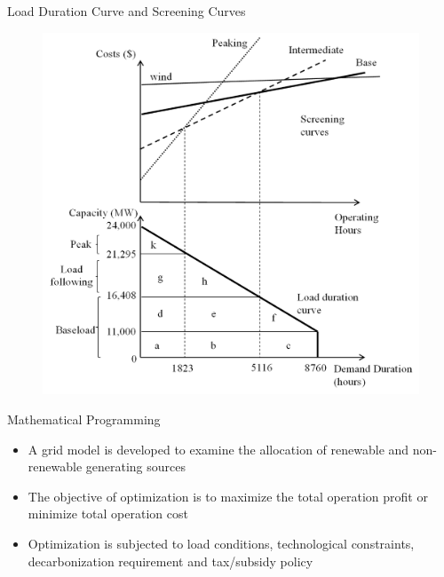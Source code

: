\documentclass[newPxFont,numfooter,progressbar,sectionpages]{beamer}
\begin{document}

\begin{frame}[c]{Load Duration Curve and Screening Curves}

\begin{figure}
\centering
\includegraphics[width=0.7\linewidth]{"figure/screen"}
\label{fig:screen}
\end{figure}



\end{frame}





\begin{frame}[c]{Mathematical Programming}

\begin{itemize}
\item A grid model is developed to examine the allocation of renewable and non-renewable generating sources   
\item The objective of optimization is to maximize the total operation profit or minimize total operation cost
\item Optimization is subjected to load conditions, technological constraints, decarbonization requirement and tax/subsidy policy 

\end{itemize}


\end{frame}
\end{document}
